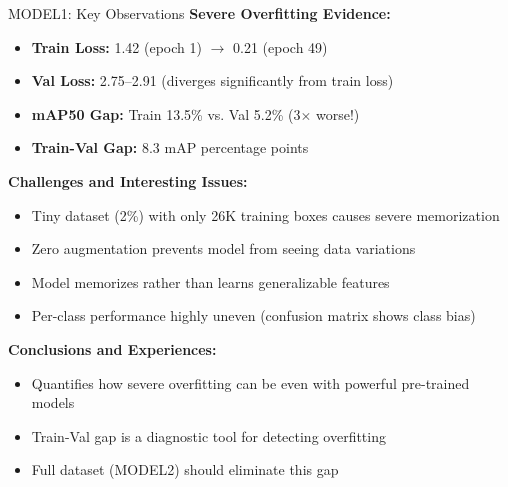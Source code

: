 \documentclass{beamer}
\begin{document}
\begin{frame}{MODEL1: Key Observations}
    \textbf{Severe Overfitting Evidence:}
    \begin{itemize}
        \item \textbf{Train Loss:} 1.42 (epoch 1) $\rightarrow$ 0.21 (epoch 49)
        \item \textbf{Val Loss:} 2.75--2.91 (diverges significantly from train loss)
        \item \textbf{mAP50 Gap:} Train 13.5\% vs. Val 5.2\% (3$\times$ worse!)
        \item \textbf{Train-Val Gap:} 8.3 mAP percentage points
    \end{itemize}

    \vspace{0.3cm}
    \textbf{Challenges and Interesting Issues:}
    \begin{itemize}
        \item Tiny dataset (2\%) with only 26K training boxes causes severe memorization
        \item Zero augmentation prevents model from seeing data variations
        \item Model memorizes rather than learns generalizable features
        \item Per-class performance highly uneven (confusion matrix shows class bias)
    \end{itemize}

    \vspace{0.3cm}
    \textbf{Conclusions and Experiences:}
    \begin{itemize}
        \item Quantifies how severe overfitting can be even with powerful pre-trained models
        \item Train-Val gap is a diagnostic tool for detecting overfitting
        \item Full dataset (MODEL2) should eliminate this gap
    \end{itemize}
\end{frame}
\end{document}
